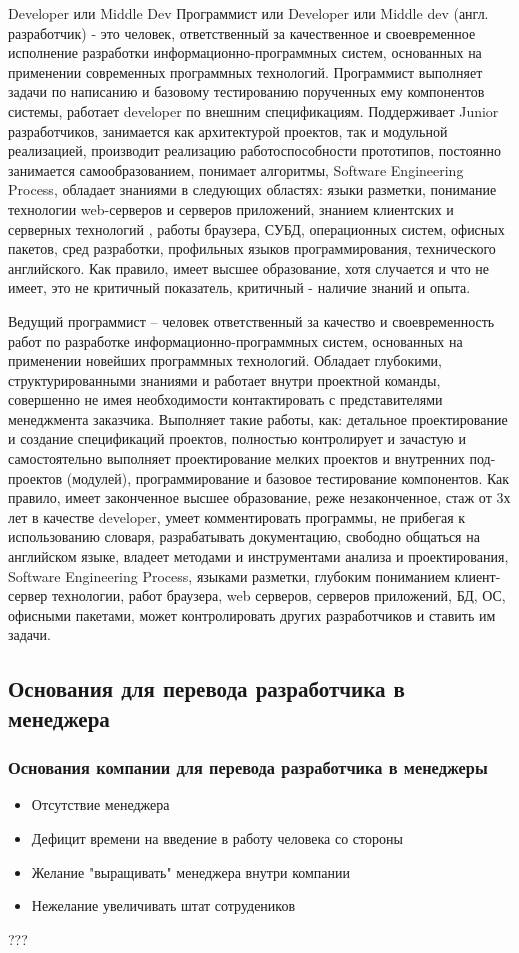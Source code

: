 \documentclass{../industrial-development}
\begin{document}
Developer или Middle Dev
Программист или Developer или Middle dev (англ. разработчик) - это человек, ответственный за качественное и своевременное исполнение разработки информационно-программных систем, основанных на применении современных программных технологий. Программист выполняет задачи по написанию и базовому тестированию порученных ему компонентов системы, работает developer по внешним спецификациям. Поддерживает Junior разработчиков, занимается как архитектурой проектов, так и модульной реализацией, производит реализацию работоспособности прототипов, постоянно занимается самообразованием, понимает алгоритмы, Software Engineering Process, обладает знаниями в следующих областях: языки разметки, понимание технологии web-серверов и серверов приложений, знанием клиентских и серверных технологий , работы браузера, СУБД, операционных систем, офисных пакетов, сред разработки, профильных языков программирования, технического английского. Как правило, имеет высшее образование, хотя случается и что не имеет, это не критичный показатель, критичный -  наличие знаний и опыта.

 Ведущий программист – человек ответственный за качество и своевременность работ по разработке информационно-программных систем, основанных на применении новейших программных технологий. Обладает глубокими, структурированными знаниями и работает внутри проектной команды, совершенно не имея необходимости контактировать с представителями менеджмента заказчика. Выполняет такие работы, как: детальное проектирование и создание спецификаций проектов, полностью контролирует и зачастую и самостоятельно выполняет проектирование мелких проектов и внутренних под-проектов (модулей), программирование и базовое тестирование компонентов. Как правило, имеет законченное высшее образование, реже незаконченное, стаж от 3х лет в качестве developer, умеет комментировать программы, не прибегая к использованию словаря, разрабатывать документацию, свободно общаться на английском языке, владеет методами и инструментами анализа и проектирования, Software Engineering Process, языками разметки, глубоким пониманием клиент-сервер технологии, работ браузера, web серверов, серверов приложений, БД, ОС, офисными пакетами, может контролировать других разработчиков и ставить им задачи.
~\cite{How_to_be_a_good_IT-manager}

\subsection{Основания для перевода разработчика в менеджера}
\begin{frame} \frametitle{Основания компании для перевода разработчика в менеджеры}
\begin{itemize}
		\item Отсутствие менеджера
		\item Дефицит времени на введение в работу человека со стороны
		\item Желание "выращивать" менеджера внутри компании
		\item Нежелание увеличивать штат сотрудеников
	\end{itemize}
\end{frame}
\lecturenotes
???
~\cite{How_to_be_a_good_IT-manager}
\end{document}
